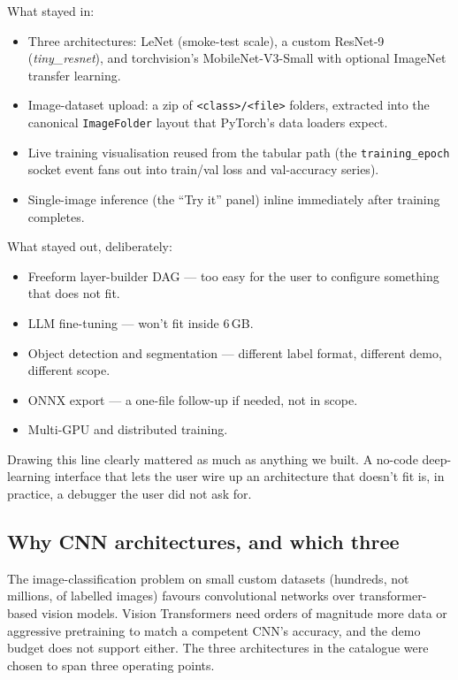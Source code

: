 \documentclass[12pt, a4paper, oneside]{report}
\begin{document}
What stayed in:

\begin{itemize}
    \item Three architectures: LeNet (smoke-test scale), a custom
        ResNet-9 (\textit{tiny\_resnet}), and torchvision's
        MobileNet-V3-Small with optional ImageNet transfer
        learning.
    \item Image-dataset upload: a zip of \texttt{<class>/<file>}
        folders, extracted into the canonical \texttt{ImageFolder}
        layout that PyTorch's data loaders expect.
    \item Live training visualisation reused from the tabular path
        (the \texttt{training\_epoch} socket event fans out into
        train/val loss and val-accuracy series).
    \item Single-image inference (the ``Try it'' panel) inline
        immediately after training completes.
\end{itemize}

What stayed out, deliberately:

\begin{itemize}
    \item Freeform layer-builder DAG --- too easy for the user to
        configure something that does not fit.
    \item LLM fine-tuning --- won't fit inside 6\,GB.
    \item Object detection and segmentation --- different label
        format, different demo, different scope.
    \item ONNX export --- a one-file follow-up if needed, not in
        scope.
    \item Multi-GPU and distributed training.
\end{itemize}

Drawing this line clearly mattered as much as anything we built. A
no-code deep-learning interface that lets the user wire up an
architecture that doesn't fit is, in practice, a debugger the user
did not ask for.

\subsection{Why CNN architectures, and which three}

The image-classification problem on small custom datasets
(hundreds, not millions, of labelled images) favours convolutional
networks over transformer-based vision models. Vision Transformers
need orders of magnitude more data or aggressive pretraining to
match a competent CNN's accuracy, and the demo budget does not
support either. The three architectures in the catalogue were chosen
to span three operating points.
\end{document}
